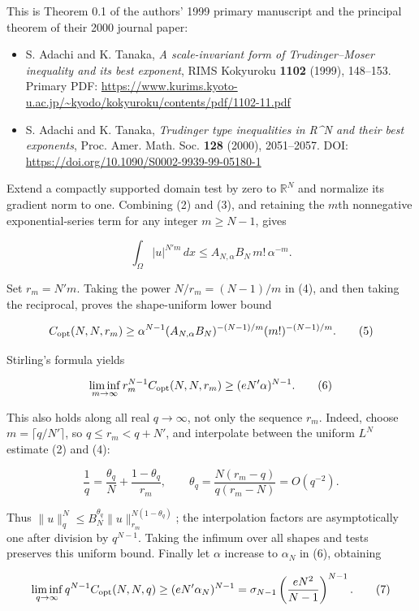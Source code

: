 \documentclass[11pt,a4paper]{article}
\providecommand{\tightlist}{\setlength{\itemsep}{0pt}\setlength{\parskip}{0pt}}
\begin{document}
This is Theorem 0.1 of the authors' 1999 primary manuscript and the
principal theorem of their 2000 journal paper:

\begin{itemize}
\tightlist
\item
  S. Adachi and K. Tanaka, \emph{A scale-invariant form of
  Trudinger--Moser inequality and its best exponent}, RIMS Kokyuroku
  \textbf{1102} (1999), 148--153. Primary PDF:
  \url{https://www.kurims.kyoto-u.ac.jp/~kyodo/kokyuroku/contents/pdf/1102-11.pdf}
\item
  S. Adachi and K. Tanaka, \emph{Trudinger type inequalities in R\^{}N
  and their best exponents}, Proc. Amer. Math. Soc. \textbf{128} (2000),
  2051--2057. DOI: \url{https://doi.org/10.1090/S0002-9939-99-05180-1}
\end{itemize}

Extend a compactly supported domain test by zero to \(\mathbb R^N\) and
normalize its gradient norm to one. Combining (2) and (3), and retaining
the \(m\)th nonnegative exponential-series term for any integer
\(m\ge N-1\), gives

\[
\int_\Omega |u|^{N'm}\,dx
\le A_{N,\alpha}B_N\,m!\,\alpha^{-m}.
\tag{4}
\]

Set \(r_m=N'm\). Taking the power \(N/r_m=(N-1)/m\) in (4), and then
taking the reciprocal, proves the shape-uniform lower bound

\[
C_{\rm opt}(N,N,r_m)
\ge \alpha^{N-1}
(A_{N,\alpha}B_N)^{-(N-1)/m}
(m!)^{-(N-1)/m}.
\tag{5}
\]

Stirling's formula yields

\[
\liminf_{m\to\infty}r_m^{N-1}C_{\rm opt}(N,N,r_m)
\ge(eN'\alpha)^{N-1}.
\tag{6}
\]

This also holds along all real \(q\to \infty\), not only the sequence
\(r_m\). Indeed, choose \(m=\lceil q/N'\rceil\), so \(q\le r_m<q+N'\),
and interpolate between the uniform \(L^N\) estimate (2) and (4):

\[
\frac1q=\frac{\theta_q}{N}+\frac{1-\theta_q}{r_m},
\qquad
\theta_q=\frac{N(r_m-q)}{q(r_m-N)}=O(q^{-2}).
\]

Thus \(\|u\|_q^N\le B_N^{\theta_q}\|u\|_{r_m}^{N(1-\theta_q)}\); the
interpolation factors are asymptotically one after division by
\(q^{N-1}\). Taking the infimum over all shapes and tests preserves this
uniform bound. Finally let \(\alpha\) increase to \(\alpha _N\) in (6),
obtaining

\[
\liminf_{q\to\infty}q^{N-1}C_{\rm opt}(N,N,q)
\ge(eN'\alpha_N)^{N-1}
=\sigma_{N-1}\left(\frac{eN^2}{N-1}\right)^{N-1}.
\tag{7}
\]
\end{document}
